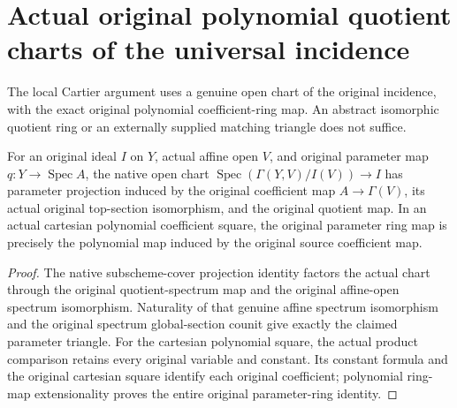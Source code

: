 \section{Actual original polynomial quotient charts of the universal incidence}

The local Cartier argument uses a genuine open chart of the original
incidence, with the exact original polynomial coefficient-ring map. An
abstract isomorphic quotient ring or an externally supplied matching
triangle does not suffice.

\begin{lemma}
\label{lem:kn-nadel-bertini-native-chart-parameter}
\leanok
For an original ideal $I$ on $Y$, actual affine open $V$, and original
parameter map $q:Y\to\operatorname{Spec}A$, the native open chart
$\operatorname{Spec}(\Gamma(Y,V)/I(V))\to I$ has parameter projection
induced by the original coefficient map $A\to\Gamma(V)$, its actual
original top-section isomorphism, and the original quotient map. In an
actual cartesian polynomial coefficient square, the original parameter
ring map is precisely the polynomial map induced by the original source
coefficient map.
\end{lemma}
\begin{proof}
The native subscheme-cover projection identity factors the actual chart
through the original quotient-spectrum map and the original affine-open
spectrum isomorphism. Naturality of that genuine affine spectrum
isomorphism and the original spectrum global-section counit give exactly
the claimed parameter triangle. For the cartesian polynomial square, the
actual product comparison retains every original variable and constant.
Its constant formula and the original cartesian square identify each
original coefficient; polynomial ring-map extensionality proves the
entire original parameter-ring identity.
\end{proof}

